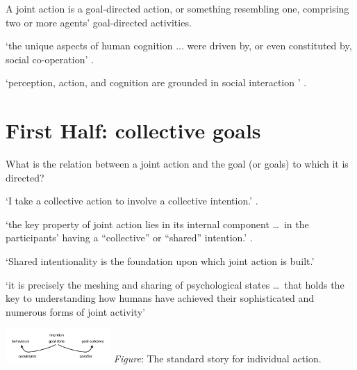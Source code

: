 \documentclass[12pt]{extarticle}
\date{}
\begin{document}
\begin{multicols}{3}

\setlength\footnotesep{1em}



\maketitle



A joint action is a goal-directed action, or something resembling one, comprising two or more agents' goal-directed activities. 

`the unique aspects of human cognition ... were driven by, or even constituted by, social co-operation'
\citep[p.\ 1]{Moll:2007gu}.

`perception, action, and cognition are grounded in social interaction%
' \citep[p.\ 103]{Knoblich:2006bn}.

\section{First Half: collective goals}
What is the relation between a joint action and the goal (or goals) to which it is directed?

`I take a collective action to involve a collective intention.'  \citep[p.\ 5]{Gilbert:2006wr}.

`the key property of joint action lies in its internal component \ldots \ in the participants’ having a ``collective'' or ``shared'' intention.' \citep[pp. 444-5]{alonso_shared_2009}.

`Shared intentionality is the foundation upon which joint action is built.' \citep[p.\ 381]{Carpenter:2009wq}

`it is precisely the meshing and sharing of psychological states \ldots \ that holds the key to understanding how humans have achieved their sophisticated and numerous forms of joint activity'
\citep[p.\ 369]{Call:2009fk}

\begin{center}
  \includegraphics[width=0.3\textwidth]{standard_story.png}
\emph{Figure}: The standard story for individual action.
\end{center}




\end{multicols}
\end{document}
